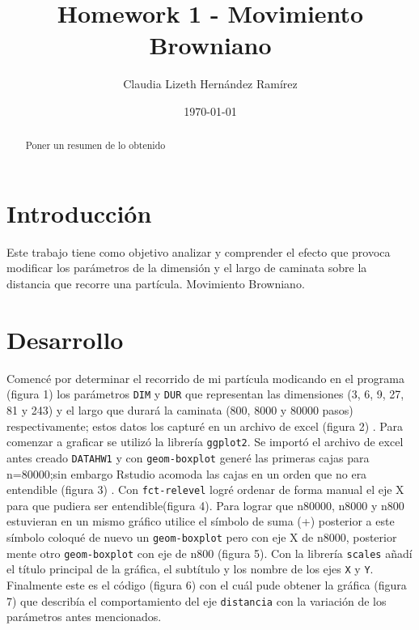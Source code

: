 \documentclass{article}
\author{Claudia Lizeth Hern\'andez Ram\'irez} %
\title{Homework 1 - Movimiento Browniano} %
\date{\today}
\begin{document}

\maketitle %



\begin{abstract} %
  \centering
  Poner un resumen de lo obtenido
\end{abstract}


\section{Introducci\'{o}n}\label{intro} %

Este trabajo tiene como objetivo analizar y comprender el efecto que provoca modificar los par\'ametros de la dimensi\'on y el largo de caminata sobre la distancia que recorre una part\'icula. Movimiento Browniano. 




\section{Desarrollo}\label{desarrollo} %

Comenc\'e por determinar el recorrido de mi part\'icula modicando en el programa (figura 1) \citep{DraElisa} los par\'ametros \texttt{DIM} y \texttt{DUR} que representan las dimensiones (3, 6, 9, 27, 81 y 243) y el largo que durar\'a la caminata (800, 8000 y 80000 pasos) respectivamente; estos datos los capturé en un archivo de excel (figura 2) \cite{excel}.
Para comenzar a graficar se utiliz\'o la librer\'ia \texttt{ggplot2}. \citep{ejemplo} \cite{ggplot}
Se import\'o el archivo de excel antes creado \texttt{DATAHW1} y con \texttt{geom-boxplot} \citep{geom}  gener\'e las primeras cajas para n=80000;sin embargo Rstudio acomoda las cajas en un orden que no era entendible (figura 3) \cite{primerintento} . Con \texttt{fct-relevel} \citep{fct} logr\'e ordenar de forma manual el eje X para que pudiera ser entendible(figura 4).
Para lograr que n80000, n8000 y n800 \citep{superponer} \cite{rggvideo} estuvieran en un mismo gr\'afico utilice el s\'imbolo de suma (+) posterior a este s\'imbolo coloqué de nuevo un \texttt{geom-boxplot} pero con eje X de n8000, posterior mente otro \texttt{geom-boxplot} con eje de n800 (figura 5).
Con la librer\'ia \texttt{scales} añad\'i el t\'itulo principal de la gr\'afica, el subt\'itulo y los nombre de los ejes \texttt{X} y \texttt{Y}.
Finalmente este es el c\'odigo (figura 6) con el cu\'al pude obtener la gr\'afica (figura 7) que describ\'ia el comportamiento del eje  \texttt{distancia} con la variaci\'on de los par\'ametros antes mencionados.
\end{document}
